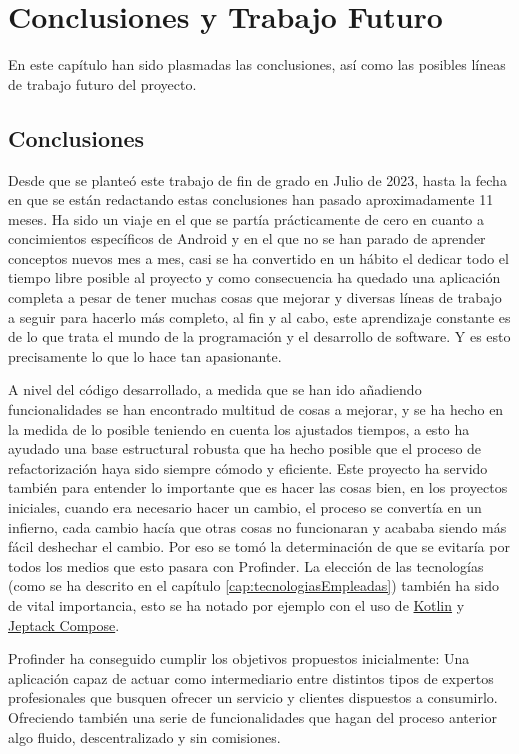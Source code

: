 \chapter{Conclusiones y Trabajo Futuro}
\label{cap:conclusiones}
En este capítulo han sido plasmadas las conclusiones, así como las posibles líneas de trabajo futuro del proyecto.
\section{Conclusiones}
Desde que se planteó este trabajo de fin de grado en Julio de 2023, hasta la fecha en que se están redactando estas conclusiones han pasado aproximadamente 11 meses. Ha sido un viaje en el que se partía prácticamente de cero en cuanto a concimientos específicos de Android y en el que no se han parado de aprender conceptos nuevos mes a mes, casi se ha convertido en un hábito el dedicar todo el tiempo libre posible al proyecto y como consecuencia ha quedado una aplicación completa a pesar de tener muchas cosas que mejorar y diversas líneas de trabajo a seguir para hacerlo más completo, al fin y al cabo, este aprendizaje constante es de lo que trata el mundo de la programación y el desarrollo de software. Y es esto precisamente lo que lo hace tan apasionante.

A nivel del código desarrollado, a medida que se han ido añadiendo funcionalidades se han encontrado multitud de cosas a mejorar, y se ha hecho en la medida de lo posible teniendo en cuenta los ajustados tiempos, a esto ha ayudado una base estructural robusta que ha hecho posible que el proceso de refactorización haya sido siempre cómodo y eficiente. Este proyecto ha servido también para entender lo importante que es hacer las cosas bien, en los proyectos iniciales, cuando era necesario hacer un cambio, el proceso se convertía en un infierno, cada cambio hacía que otras cosas no funcionaran y acababa siendo más fácil deshechar el cambio. Por eso se tomó la determinación de que se evitaría por todos los medios que esto pasara con Profinder. La elección de las tecnologías (como se ha descrito en el capítulo \ref{cap:tecnologiasEmpleadas}) también ha sido de vital importancia, esto se ha notado por ejemplo con el uso de \hyperlink{subsec:kotlin}{Kotlin} y \hyperlink{subsec:compose}{Jeptack Compose}.

Profinder ha conseguido cumplir los objetivos propuestos inicialmente: Una aplicación capaz de actuar como intermediario entre distintos tipos de expertos profesionales que busquen ofrecer un servicio y clientes dispuestos a consumirlo. Ofreciendo también una serie de funcionalidades que hagan del proceso anterior algo fluido, descentralizado y sin comisiones.


